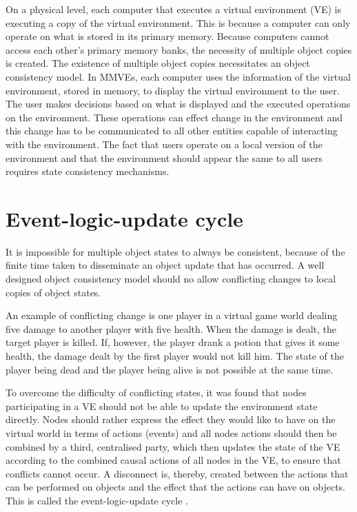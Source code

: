 On a physical level, each computer that executes a virtual environment (VE) is executing a copy of the virtual environment. This is because a computer can only operate on what is stored in its primary memory. Because computers cannot access each other's primary memory banks, the necessity of multiple object copies is created. The existence of multiple object copies necessitates an object consistency model. In MMVEs, each computer uses the information of the virtual environment, stored in memory, to display the virtual environment to the user. The user makes decisions based on what is displayed and the executed operations on the environment. These operations can effect change in the environment and this change has to be communicated to all other entities capable of interacting with the environment. The fact that users operate on a local version of the environment and that the environment should appear the same to all users requires state consistency mechanisms.

\section{Event-logic-update cycle}
\label{event_logic_update}

It is impossible for multiple object states to always be consistent, because of the finite time taken to disseminate an object update that has occurred. A well designed object consistency model should no allow conflicting changes to local copies of object states.

An example of conflicting change is one player in a virtual game world dealing five damage to another player with five health. When the damage is dealt, the target player is killed. If, however, the player drank a potion that gives it some health, the damage dealt by the first player would not kill him. The state of the player being dead and the player being alive is not possible at the same time.

To overcome the difficulty of conflicting states, it was found that nodes participating in a VE should not be able to update the environment state directly. Nodes should rather express the effect they would like to have on the virtual world in terms of actions (events) and all nodes actions should then be combined by a third, centralised party, which then updates the state of the VE according to the combined causal actions of all nodes in the VE, to ensure that conflicts cannot occur. A disconnect is, thereby, created between the actions that can be performed on objects and the effect that the actions can have on objects. This is called the event-logic-update cycle \cite{}.


